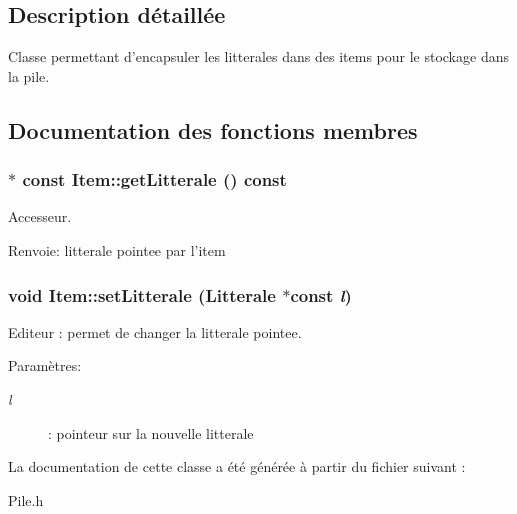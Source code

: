 \subsection{Description détaillée}
Classe permettant d'encapsuler les litterales dans des items pour le stockage dans la pile. 

\subsection{Documentation des fonctions membres}
\hypertarget{class_item_128005ee69ac247ac82460c21f85ce3f}{
\subsubsection[{getLitterale}]{$\ast$ const Item::getLitterale () const}}
\label{class_item_128005ee69ac247ac82460c21f85ce3f}


Accesseur. 

\begin{Desc}
\item[Renvoie:]litterale pointee par l'item \end{Desc}
\hypertarget{class_item_0c2c0a79074c81befa8d1956636cd67d}{
\subsubsection[{setLitterale}]{\setlength{\rightskip}{0pt plus 5cm}void Item::setLitterale ({\bf Litterale} $\ast$const  {\em l})}}
\label{class_item_0c2c0a79074c81befa8d1956636cd67d}


Editeur : permet de changer la litterale pointee. 

\begin{Desc}
\item[Paramètres:]
\begin{description}
\item[{\em l}]: pointeur sur la nouvelle litterale \end{description}
\end{Desc}


La documentation de cette classe a été générée à partir du fichier suivant :\begin{CompactItemize}
\item 
Pile.h\end{CompactItemize}
